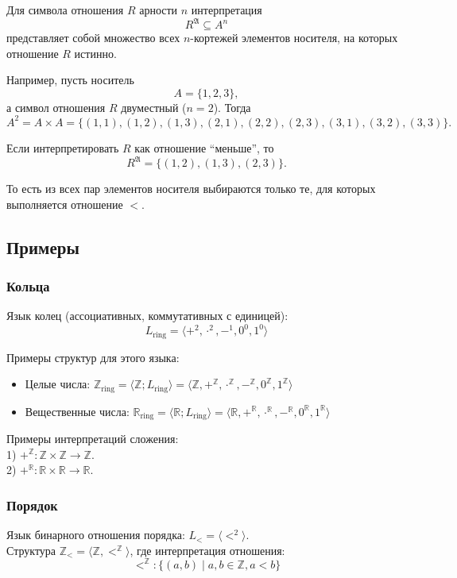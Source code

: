 \documentclass[12pt,a4paper,oneside,openany]{book}
\theoremstyle{definition}
\theoremstyle{plain}
\theoremstyle{remark}
\begin{document}
Для символа отношения $R$ арности $n$ интерпретация
\[
R^{\mathfrak A}\subseteq A^n
\]
представляет собой множество всех $n$-кортежей элементов носителя, на которых отношение $R$ истинно.

Например, пусть носитель
\[
A=\{1,2,3\},
\]
а символ отношения $R$ двуместный ($n=2$). Тогда
\[
A^2=A\times A=
\{(1,1),(1,2),(1,3),(2,1),(2,2),(2,3),(3,1),(3,2),(3,3)\}.
\]

Если интерпретировать $R$ как отношение ``меньше'', то
\[
R^{\mathfrak A}
=
\{(1,2),(1,3),(2,3)\}.
\]

То есть из всех пар элементов носителя выбираются только те, для которых выполняется отношение $<$.
\subsection{Примеры}

\subsubsection{Кольца}
Язык колец (ассоциативных, коммутативных с единицей):
\[ L_{\text{ring}} = \langle +^2, \cdot^2, -^1, 0^0, 1^0 \rangle \]

Примеры структур для этого языка:
\begin{itemize}
    \item Целые числа: $\mathbb{Z}_{\text{ring}} = \langle \mathbb{Z}; L_{\text{ring}} \rangle = \langle \mathbb{Z}, +^{\mathbb{Z}}, \cdot^{\mathbb{Z}}, -^{\mathbb{Z}}, 0^{\mathbb{Z}}, 1^{\mathbb{Z}} \rangle$
    \item Вещественные числа: $\mathbb{R}_{\text{ring}} = \langle \mathbb{R}; L_{\text{ring}} \rangle = \langle \mathbb{R}, +^{\mathbb{R}}, \cdot^{\mathbb{R}}, -^{\mathbb{R}}, 0^{\mathbb{R}}, 1^{\mathbb{R}} \rangle$
\end{itemize}
Примеры интерпретаций сложения: \\
1) $+^{\mathbb{Z}}: \mathbb{Z} \times \mathbb{Z} \to \mathbb{Z}$.\\
2) $+^{\mathbb{R}}: \mathbb{R} \times \mathbb{R} \to \mathbb{R}$.

\subsubsection{Порядок}
Язык бинарного отношения порядка: $L_{<} = \langle <^2 \rangle$. \\
Структура $\mathbb{Z}_{<} = \langle \mathbb{Z}, <^{\mathbb{Z}} \rangle$, где интерпретация отношения:
\[ <^{\mathbb{Z}} : \{ (a, b) \mid a, b \in \mathbb{Z}, a < b \} \]
\end{document}
